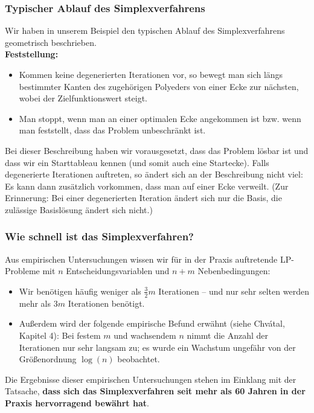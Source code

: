 \documentclass[smaller]{beamer}
\begin{document}
\begin{frame}
 \frametitle{Typischer Ablauf des Simplexverfahrens}
 Wir haben in unserem Beispiel \alert{den typischen Ablauf des Simplexverfahrens} geometrisch beschrieben. \\ \vspace*{0.2cm}
\textbf{Feststellung:} 
\begin{itemize}
\item Kommen keine degenerierten Iterationen vor, \alert{so bewegt man sich längs bestimmter Kanten des zugehörigen Polyeders von einer Ecke zur nächsten, wobei der Zielfunktionswert steigt.} 
\item \alert{Man stoppt, wenn man an einer optimalen Ecke angekommen ist} bzw. wenn man feststellt, dass das Problem unbeschränkt ist.
\end{itemize}

Bei dieser Beschreibung haben wir vorausgesetzt, dass das Problem lösbar ist und dass wir ein Starttableau kennen (und somit auch eine \alert{Startecke}). Falls degenerierte Iterationen auftreten, so ändert sich an der Beschreibung nicht viel: Es kann dann zusätzlich vorkommen, dass man auf einer Ecke verweilt. (Zur Erinnerung: Bei einer degenerierten Iteration ändert sich nur die Basis, die zulässige Basislösung ändert sich nicht.)
\end{frame}

\begin{frame}
 \frametitle{Wie schnell ist das Simplexverfahren?}
 Aus empirischen Untersuchungen wissen wir für in der Praxis auftretende LP-Probleme mit $n$ Entscheidungsvariablen und $n+m$ Nebenbedingungen:
 \begin{itemize}
 \item Wir benötigen häufig weniger als $\frac{3}{2}m$ Iterationen -- und nur sehr selten werden mehr als $3m$ Iterationen benötigt. 
 \item Außerdem wird der folgende empirische Befund erwähnt (siehe Chvátal, Kapitel 4): Bei festem $m$ und wachsendem $n$ nimmt die Anzahl der Iterationen nur sehr langsam zu; es wurde ein Wachstum ungefähr von der Größenordnung $\log(n)$ beobachtet.
\end{itemize}
 \alert{Die Ergebnisse dieser empirischen Untersuchungen stehen im Einklang mit der Tatsache, \textbf{dass sich das Simplexverfahren seit mehr als 60 Jahren in der Praxis hervorragend bewährt hat}}.
\end{frame}
 
\end{document}
